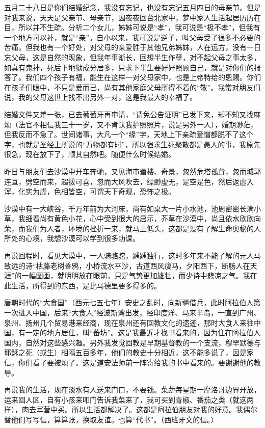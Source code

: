 \par {}
\par 五月二十八日是你们结婚纪念，我没有忘记，也没有忘记五月四日的母亲节。但是对我来说，天天是父亲节、母亲节，因夜夜回台北家中，梦中家人生活起居历历在目，所以并不生疏。分析二个女儿，姊姊可说是“孝”，我可说是“极不孝”，但我有一个地方可以补，就是“亲”。自小以来，我可说是逆子，叫父母受了很多不必要的苦痛，但我也有一个好处，对父母的亲爱胜于其他兄弟姊妹，人在远方，没有一日忘父母，这是自然的现象，但我年事渐长，回想半生作孽，对不起父母之事太多，如真有鬼神，死后下地狱成分居多，只求下半生要好好照顾自己，就是对你们的报答了。我们四个孩子有福，能生在这样一对父母家中，也是上帝特给的恩赐。你们在孩子们眼中，不只是爱而已，尚有其他家庭父母所得不着的“敬”。我常对朋友们说，我的父母这世上找不出另外一对，这是我最大的幸福了。
\par 结婚文件又差一张，已去葡萄牙再申请，“请免公告证明”已发下来，却不知又找麻烦（法官不相信我三十一岁，又不肯认我护照照片，说是另外一人），婚期渺茫，但我反而不急了。世间诸事，大凡一个“缘”字，天地上下亲疏爱憎都脱不了这个字，也就是圣经上所说的“万物都有时”，所以强求生死聚散都是愚人的事，我原先很急，现在放下了，顺其自然吧。随便什么时候结婚。
\par 昨日与朋友们去沙漠中开车奔驰，又见海市蜃楼、奇景，忽然危塔孤耸，忽而城郭连亘，劈空而来，超拔可喜，忽而大风吹去，缥缈虚无，是空是色，然后返虚入浑，化实为虚，色相皆空，可谓天下奇观，恐怖之极。
\par 沙漠中有一大峡谷，千万年前为大河床，尚有如桌大一片小水池，池周密密长满小草，我细看尚有黄色小花，心中受到很大的启示，芥草在沙漠中，尚且依水欣欣向荣，而我们为人者，环境的挫折一来，就马上低头，这都是没有了解生命奥秘的人所处的心境，我想沙漠可以学到很多功课。
\par 再说回程时，看见大漠中，一人骑骆驼，踽踽独行，这时多年来不能了解的元人马致远的诗“枯藤老树昏鸦，小桥流水平沙，古道西风瘦马，夕阳西下，断肠人在天涯”的一幅图画，就明明放在眼前，只是气势更加雄壮，而少诗中悲凉之气。我在此生活，所得到的东西，是比马德里要多得多的。
\par 唐朝时代的“大食国”（西元七五七年）安史之乱时，向新疆借兵，此时阿拉伯人第一次进入中国，后来“大食人”经波斯湾出发，经印度洋、马来半岛，一直到广州、泉州、扬州几个贸易港来经商，现在泉州还有回教文化的遗迹，那时大食人来往中国，有一定的地方居住，叫“蕃坊”。这是我最近才找书看来的。因为住在阿拉伯人国内，自然对这些感兴趣。另外我发觉回教是早期基督教的一个支流，穆罕默德与耶稣之死（或生）相隔五百多年，他们的教史十分相近，这不能多说了，因是家信，你们看了要被烦了。这是道安法师前一阵寄给我的书中看来的。要谢谢他的教导。
\par 再说我的生活，现在淡水有人送来门口，不要钱。菜蔬每星期一摩洛哥边界开放，运来回人区，自有小孩来叩门告诉我菜来了，我可买到青椒、番茄之类（就这两样），肉去军营中买。所以生活都解决了。这都是阿拉伯朋友对我的好意。我偶尔替他们写写信，算算账，换取友谊。也算“代书”。（西班牙文的信。）
